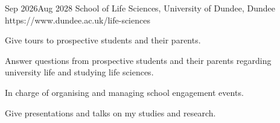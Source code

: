 


	\begin{VolunteerRoleEntries}%
		{Sep 2026}{Aug 2028}%
		{School of Life Sciences, University of Dundee, Dundee}%
		{https://www.dundee.ac.uk/life-sciences}%
		{
			\item Give tours to prospective students and their parents.
			\item Answer questions from prospective students and their parents regarding university life and studying life sciences.
			\item In charge of organising and managing school engagement events.
			\item Give presentations and talks on my studies and research.
		}%
	\end{VolunteerRoleEntries}%

